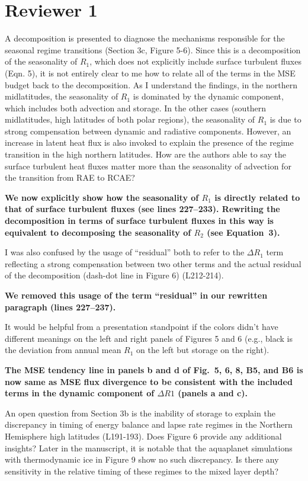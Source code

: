 \documentclass{article}
\begin{document}
\section*{Reviewer 1}
A decomposition is presented to diagnose the mechanisms responsible for the seasonal regime transitions (Section 3c, Figure 5-6). Since this is a decomposition of the seasonality of $R_1$, which does not explicitly include surface turbulent fluxes (Eqn. 5), it is not entirely clear to me how to relate all of the terms in the MSE budget back to the decomposition. As I understand the findings, in the northern midlatitudes, the seasonality of $R_1$ is dominated by the dynamic component, which includes both advection and storage. In the other cases (southern midlatitudes, high latitudes of both polar regions), the seasonality of $R_1$ is due to strong compensation between dynamic and radiative components. However, an increase in latent heat flux is also invoked to explain the presence of the regime transition in the high northern latitudes. How are the authors able to say the surface turbulent heat fluxes matter more than the seasonality of advection for the transition from RAE to RCAE?

\textbf{We now explicitly show how the seasonality of $R_1$ is directly related to that of surface turbulent fluxes (see lines 227--233). Rewriting the decomposition in terms of surface turbulent fluxes in this way is equivalent to decomposing the seasonality of $R_2$ (see Equation~3).}

I was also confused by the usage of ``residual'' both to refer to the $\Delta R_1$ term reflecting a strong compensation between two other terms and the actual residual of the decomposition (dash-dot line in Figure 6) (L212-214).

\textbf{We removed this usage of the term ``residual'' in our rewritten paragraph (lines 227--237).}

It would be helpful from a presentation standpoint if the colors didn't have different meanings on the left and right panels of Figures 5 and 6 (e.g., black is the deviation from annual mean $R_1$ on the left but storage on the right).

\textbf{The MSE tendency line in panels b and d of Fig.~5, 6, 8, B5, and B6 is now same as MSE flux divergence to be consistent with the included terms in the dynamic component of $\Delta R1$ (panels a and c).}

An open question from Section 3b is the inability of storage to explain the discrepancy in timing of energy balance and lapse rate regimes in the Northern Hemisphere high latitudes (L191-193). Does Figure 6 provide any additional insights? Later in the manuscript, it is notable that the aquaplanet simulations with thermodynamic ice in Figure 9 show no such discrepancy. Is there any sensitivity in the relative timing of these regimes to the mixed layer depth?
\end{document}
